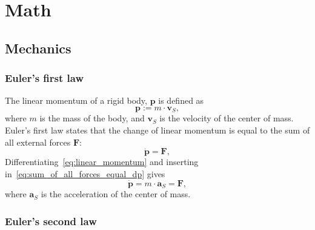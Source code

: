 \documentclass[10pt,a4paper,fleqn]{article}
\newcommand{\bVec}[1]{\mathbf{#1}}
\begin{document}
\section{Math}

\subsection{Mechanics}

\subsubsection{Euler's first law}

The linear momentum of a rigid body, $\bVec{p}$ is defined as 
%
\begin{equation}
	 \bVec{p} := m\cdot   \bVec{v}_S,
	 \label{eq:linear_momentum}
\end{equation}
%
where $m$ is the mass of the body, and $\bVec{v}_S$ is the velocity of the center of mass.
Euler's first law states that the change of linear momentum is equal to the sum of all external forces $\bVec{F}$:
%
\begin{equation}
	\dot{\bVec{p}} =   \bVec{F},
	\label{eq:sum_of_all_forces_equal_dp}
\end{equation}
%
Differentiating~\eqref{eq:linear_momentum} and inserting in~\eqref{eq:sum_of_all_forces_equal_dp} gives
%
\begin{equation}
	\dot{\bVec{p}} = m \cdot   \bVec{a}_S =   \bVec{F},
	\label{eq:pdot_equal_F}
\end{equation}
%
where $\bVec{a}_S$ is the acceleration of the center of mass.	

\subsubsection{Euler's second law}	
\end{document}
